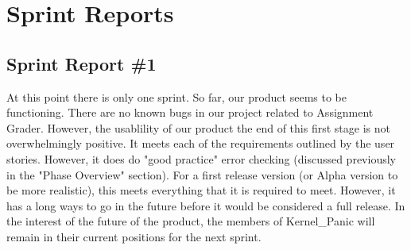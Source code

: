 
\chapter{Sprint Reports}

\section{Sprint Report \#1}
At this point there is only one sprint. So far, our product seems to be functioning. There are no known bugs in our project related to Assignment Grader.\newline
\newline
However, the usablility of our product the end of this first stage is not overwhelmingly positive. It meets each of the requirements outlined by the user stories. However, it does do "good practice" error checking (discussed previously in the "Phase Overview" section).\newline
\newline
For a first release version (or Alpha version to be more realistic), this meets everything that it is required to meet. However, it has a long ways to go in the future before it would be considered a full release.\newline
\newline
In the interest of the future of the product, the members of Kernel\_Panic will remain in their current positions for the next sprint.
